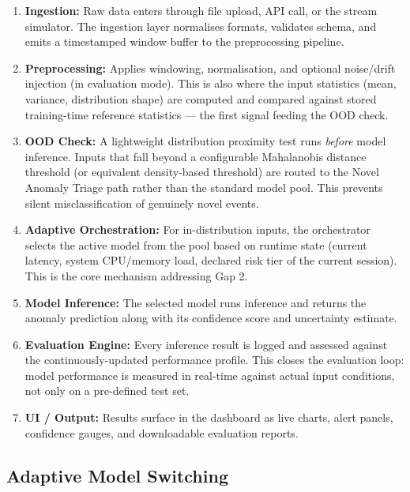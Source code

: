 \documentclass[11pt, a4paper]{article}
\begin{document}
\begin{enumerate}[leftmargin=1.5em, itemsep=5pt]
  \item \textbf{Ingestion:} Raw data enters through file upload, API call, or the stream simulator.
  The ingestion layer normalises formats, validates schema, and emits a timestamped
  window buffer to the preprocessing pipeline.

  \item \textbf{Preprocessing:} Applies windowing, normalisation, and optional
  noise/drift injection (in evaluation mode). This is also where the
  input statistics (mean, variance, distribution shape) are computed 
  and compared against stored training-time reference statistics —
  the first signal feeding the OOD check.

  \item \textbf{OOD Check:} A lightweight distribution proximity test runs
  \textit{before} model inference. Inputs that fall beyond a configurable
  Mahalanobis distance threshold (or equivalent density-based threshold)
  are routed to the Novel Anomaly Triage path rather than the standard model pool.
  This prevents silent misclassification of genuinely novel events.

  \item \textbf{Adaptive Orchestration:} For in-distribution inputs,
  the orchestrator selects the active model from the pool based on runtime state
  (current latency, system CPU/memory load, declared risk tier of the current session).
  This is the core mechanism addressing Gap 2.

  \item \textbf{Model Inference:} The selected model runs inference and returns
  the anomaly prediction along with its confidence score and uncertainty estimate.

  \item \textbf{Evaluation Engine:} Every inference result is logged and assessed
  against the continuously-updated performance profile. This closes the evaluation loop:
  model performance is measured in real-time against actual input conditions, not
  only on a pre-defined test set.

  \item \textbf{UI / Output:} Results surface in the dashboard as live charts,
  alert panels, confidence gauges, and downloadable evaluation reports.
\end{enumerate}

\subsection{Adaptive Model Switching}
\end{document}
